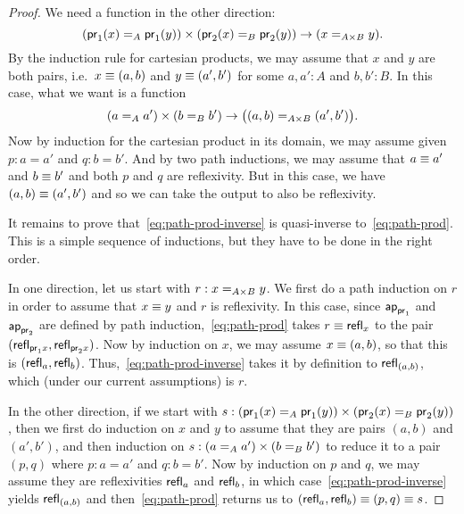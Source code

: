 \begin{proof}
  We need a function in the other direction:
  \begin{equation}
    (\id[A]{\proj1(x)}{\proj1(y)}) \times (\id[B]{\proj2(x)}{\proj2(y)}) \to (\id[A\times B]{x}{y}) .\label{eq:path-prod-inverse}
  \end{equation}
  By the induction rule for cartesian products, we may assume that $x$ and $y$ are both pairs, i.e.\ $x\jdeq (a,b)$ and $y\jdeq (a',b')$ for some $a,a':A$ and $b,b':B$.
  In this case, what we want is a function
  \begin{equation*}
    (\id[A]{a}{a'}) \times (\id[B]{b}{b'}) \to \big(\id[A\times B]{(a,b)}{(a',b')}\big).
  \end{equation*}
  Now by induction for the cartesian product in its domain, we may assume given $p:a=a'$ and $q:b=b'$.
  And by two path inductions, we may assume that $a\jdeq a'$ and $b\jdeq b'$ and both $p$ and $q$ are reflexivity.
  But in this case, we have $(a,b)\jdeq(a',b')$ and so we can take the output to also be reflexivity.

  It remains to prove that~\eqref{eq:path-prod-inverse} is quasi-inverse to~\eqref{eq:path-prod}.
  This is a simple sequence of inductions, but they have to be done in the right order.

  In one direction, let us start with $r:\id[A\times B]{x}{y}$.
  We first do a path induction on $r$ in order to assume that $x\jdeq y$ and $r$ is reflexivity.
  In this case, since $\apfunc{\proj1}$ and $\apfunc{\proj2}$ are defined by path induction,~\eqref{eq:path-prod} takes $r\jdeq \refl{x}$ to the pair $(\refl{\proj1x},\refl{\proj2x})$.
  Now by induction on $x$, we may assume $x\jdeq (a,b)$, so that this is $(\refl a, \refl b)$.
  Thus,~\eqref{eq:path-prod-inverse} takes it by definition to $\refl{(a,b)}$, which (under our current assumptions) is $r$.
  
  In the other direction, if we start with $s:(\id[A]{\proj1(x)}{\proj1(y)}) \times (\id[B]{\proj2(x)}{\proj2(y)})$, then we first do induction on $x$ and $y$ to assume that they are pairs $(a,b)$ and $(a',b')$, and then induction on $s:(\id[A]{a}{a'}) \times (\id[B]{b}{b'})$ to reduce it to a pair $(p,q)$ where $p:a=a'$ and $q:b=b'$.
  Now by induction on $p$ and $q$, we may assume they are reflexivities $\refl a$ and $\refl b$, in which case~\eqref{eq:path-prod-inverse} yields $\refl{(a,b)}$ and then~\eqref{eq:path-prod} returns us to $(\refl a,\refl b)\jdeq (p,q)\jdeq s$.
\end{proof}

